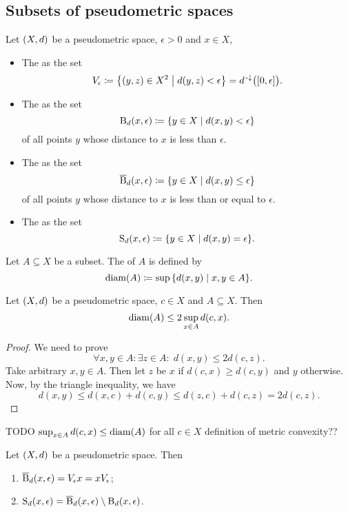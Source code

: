\subsection{Subsets of pseudometric spaces}
\begin{definition}
Let $\sSet{X,d}$ be a pseudometric space, $\epsilon >0$ and $x\in X$,
\begin{itemize}
\item The  as the set
\[ V_\epsilon \defeq \setbuilder{(y,z)\in X^2}{d(y,z)< \epsilon} = d^{\preimf}\big(\interval{0,\epsilon}\big). \]
\item The  as the set
\[ \ball_d(x,\epsilon) \defeq \setbuilder{y\in X}{d(x,y)< \epsilon} \]
of all points $y$ whose distance to $x$ is less than $\epsilon$.
\item The  as the set
\[ \cball_d(x,\epsilon) \defeq \setbuilder{y\in X}{d(x,y)\leq \epsilon} \]
of all points $y$ whose distance to $x$ is less than or equal to $\epsilon$.
\item The  as the set
\[ \sphere_d(x,\epsilon) \defeq \setbuilder{y\in X}{d(x,y) = \epsilon}. \]
\end{itemize}
Let $A\subseteq X$ be a subset. The  of $A$ is defined by
\[ \diam(A) \defeq \sup \setbuilder{d(x,y)}{x,y\in A}. \]
\end{definition}

\begin{lemma} \label{diameterBoundedByTwiceRadius}
Let $\sSet{X,d}$ be a pseudometric space, $c\in X$ and $A\subseteq X$. Then
\[ \operatorname{diam}(A) \leq 2\sup_{x\in A}d(c,x). \]
\end{lemma}
\begin{proof}
We need to prove
\[ \forall x,y\in A: \exists z\in A: \; d(x,y) \leq 2d(c,z). \]
Take arbitrary $x,y\in A$. Then let $z$ be $x$ if $d(c,x)\geq d(c,y)$ and $y$ otherwise. Now, by the triangle inequality, we have
\[ d(x,y) \leq d(x,c) + d(c,y) \leq d(z,c) + d(c,z) = 2d(c,z). \]
\end{proof}

TODO $\sup_{x\in A}{d(c,x)} \leq \operatorname{diam}(A)$ for all $c\in X$ definition of metric convexity??

\begin{lemma} \label{ballSphereLemma}
Let $\sSet{X,d}$ be a pseudometric space. Then
\begin{enumerate}
\item $\operatorname{\overline{B}}_d(x,\epsilon) = V_\epsilon x = xV_\epsilon$;
\item $\operatorname{S}_d(x,\epsilon) = \operatorname{\overline{B}}_d(x,\epsilon)\setminus \operatorname{B}_d(x,\epsilon)$.
\end{enumerate}
\end{lemma}


